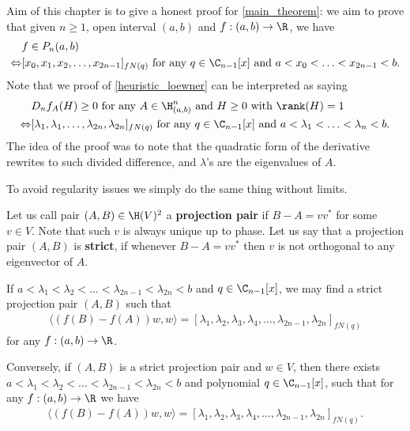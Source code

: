 Aim of this chapter is to give a honest proof for \ref{main_theorem}: we aim to prove that given $n \geq 1$, open interval $(a, b)$ and $f : (a, b) \to \R$, we have 
\begin{align*}
	& f \in P_{n}(a, b) \\
	\Leftrightarrow &[x_{0}, x_{1}, x_{2}, \ldots, x_{2 n - 1}]_{f N(q)} \text{ for any $q \in \C_{n - 1}[x]$ and $a < x_{0} < \ldots < x_{2 n - 1} < b$}.
\end{align*}
Note that we proof of \ref{heuristic_loewner} can be interpreted as saying
\begin{align*}
	& D_{n} f_{A}(H) \geq 0 \text{ for any $A \in \H^{n}_{(a, b)}$ and $H \geq 0$ with $\rank(H) = 1$} \\
	\Leftrightarrow &[\lambda_{1}, \lambda_{1}, \ldots, \lambda_{2 n}, \lambda_{2 n}]_{f N(q)} \text{ for any $q \in \C_{n - 1}[x]$ and $a < \lambda_{1} < \ldots < \lambda_{n} < b$}.
\end{align*}
The idea of the proof was to note that the quadratic form of the derivative rewrites to such divided difference, and $\lambda$'s are the eigenvalues of $A$.

To avoid regularity issues we simply do the same thing without limits.

\begin{maar}
	Let us call pair $(A, B) \in \H(V)^{2}$ a \textbf{projection pair} if $B - A = v v^{*}$ for some $v \in V$. Note that such $v$ is always unique up to phase. Let us say that a projection pair $(A, B)$ is \textbf{strict}, if whenever $B - A = v v^{*}$ then $v$ is not orthogonal to any eigenvector of $A$. 
\end{maar}

\begin{lem}\label{main_lemma}
	If $a < \lambda_{1} < \lambda_{2} < \ldots < \lambda_{2 n - 1} < \lambda_{2 n} < b$ and $q \in \C_{n - 1}[x]$, we may find a strict projection pair $(A, B)$ such that
	\begin{align*}
		\langle (f(B) - f(A)) w, w \rangle = [\lambda_{1}, \lambda_{2}, \lambda_{3}, \lambda_{4}, \ldots, \lambda_{2n - 1}, \lambda_{2 n}]_{f N(q)}
	\end{align*}
	for any $f : (a, b) \to \R$.

	Conversely, if $(A, B)$ is a strict projection pair and $w \in V$, then there exists $a < \lambda_{1} < \lambda_{2} < \ldots < \lambda_{2 n - 1} < \lambda_{2 n} < b$ and polynomial $q \in \C_{n - 1}[x]$, such that for any $f : (a, b) \to \R$ we have
	\begin{align*}
		\langle (f(B) - f(A)) w, w \rangle = [\lambda_{1}, \lambda_{2}, \lambda_{3}, \lambda_{4}, \ldots, \lambda_{2n - 1}, \lambda_{2 n}]_{f N(q)}.
	\end{align*}
\end{lem}

